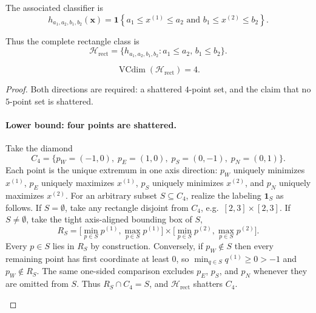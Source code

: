\documentclass[11pt,a4paper]{article}
\DeclareMathOperator{\VCdim}{VCdim}
\theoremstyle{definition}
\begin{document}
The associated classifier is
\[
h_{a_1, a_2, b_1, b_2}(\boldsymbol{x}) = \mathbf{1} \left\{ a_1 \leq x^{(1)} \leq a_2 \text{ and } b_1 \leq x^{(2)} \leq b_2 \right\}.
\]

Thus the complete rectangle class is
\[
\mathcal{H}_{\text{rect}} = \{ h_{a_1, a_2, b_1, b_2} : a_1 \leq a_2, \, b_1 \leq b_2 \}.
\]

\begin{proposition}
\label{prop:vc-rect}
\[
\VCdim(\mathcal{H}_{\mathrm{rect}})=4.
\]
\end{proposition}

\begin{proof}
Both directions are required: a shattered $4$-point set, and the claim that no $5$-point set is shattered.

\paragraph{Lower bound: four points are shattered.}
Take the diamond
\[
C_4
=
\bigl\{
p_W=(-1,0),\;
p_E=(1,0),\;
p_S=(0,-1),\;
p_N=(0,1)
\bigr\}.
\]
Each point is the unique extremum in one axis direction: $p_W$ uniquely minimizes $x^{(1)}$, $p_E$ uniquely maximizes $x^{(1)}$, $p_S$ uniquely minimizes $x^{(2)}$, and $p_N$ uniquely maximizes $x^{(2)}$. For an arbitrary subset $S\subseteq C_4$, realize the labeling $\mathbf{1}_S$ as follows. If $S=\emptyset$, take any rectangle disjoint from $C_4$, e.g.\ $[2,3]\times[2,3]$. If $S\neq\emptyset$, take the tight axis-aligned bounding box of $S$,
\[
R_S
=
\bigl[\min_{p\in S}p^{(1)},\max_{p\in S}p^{(1)}\bigr]
\times
\bigl[\min_{p\in S}p^{(2)},\max_{p\in S}p^{(2)}\bigr].
\]
Every $p\in S$ lies in $R_S$ by construction. Conversely, if $p_W\notin S$ then every remaining point has first coordinate at least $0$, so $\min_{q\in S}q^{(1)}\ge 0>-1$ and $p_W\notin R_S$. The same one-sided comparison excludes $p_E$, $p_S$, and $p_N$ whenever they are omitted from $S$. Thus $R_S\cap C_4=S$, and $\mathcal{H}_{\mathrm{rect}}$ shatters $C_4$.

\begin{center}
\end{center}


\end{proof}
\end{document}
